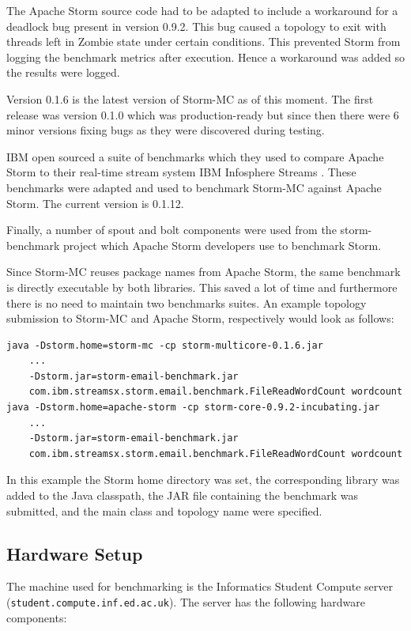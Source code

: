The Apache Storm source code had to be adapted to include a workaround for a deadlock bug present in version 0.9.2. This bug caused a topology to exit with threads left in Zombie state under certain conditions. This prevented Storm from logging the benchmark metrics after execution. Hence a workaround was added so the results were logged.

Version 0.1.6 is the latest version of Storm-MC as of this moment. The first release was version 0.1.0 which was production-ready but since then there were 6 minor versions fixing bugs as they were discovered during testing.

IBM open sourced a suite of benchmarks which they used to compare Apache Storm to their real-time stream system IBM Infosphere Streams \citep{InfoSphereStreams}. These benchmarks were adapted and used to benchmark Storm-MC against Apache Storm. The current version is 0.1.12.

Finally, a number of spout and bolt components were used from the storm-benchmark project which Apache Storm developers use to benchmark Storm.

Since Storm-MC reuses package names from Apache Storm, the same benchmark is directly executable by both libraries. This saved a lot of time and furthermore there is no need to maintain two benchmarks suites. An example topology submission to Storm-MC and Apache Storm, respectively would look as follows:

\begin{verbatim}
java -Dstorm.home=storm-mc -cp storm-multicore-0.1.6.jar
    ...
    -Dstorm.jar=storm-email-benchmark.jar
    com.ibm.streamsx.storm.email.benchmark.FileReadWordCount wordcount
java -Dstorm.home=apache-storm -cp storm-core-0.9.2-incubating.jar
    ...
    -Dstorm.jar=storm-email-benchmark.jar
    com.ibm.streamsx.storm.email.benchmark.FileReadWordCount wordcount
\end{verbatim}

In this example the Storm home directory was set, the corresponding library was added to the Java classpath, the JAR file containing the benchmark was submitted, and the main class and topology name were specified.

\subsection{Hardware Setup}

The machine used for benchmarking is the Informatics Student Compute server (\texttt{student.compute.inf.ed.ac.uk}). The server has the following hardware components:

